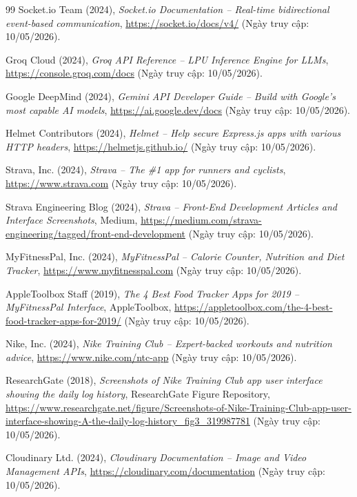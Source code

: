 \begin{thebibliography}{99}
Socket.io Team (2024), \textit{Socket.io Documentation -- Real-time bidirectional event-based communication}, \url{https://socket.io/docs/v4/} (Ngày truy cập: 10/05/2026).

Groq Cloud (2024), \textit{Groq API Reference -- LPU Inference Engine for LLMs}, \url{https://console.groq.com/docs} (Ngày truy cập: 10/05/2026).

Google DeepMind (2024), \textit{Gemini API Developer Guide -- Build with Google's most capable AI models}, \url{https://ai.google.dev/docs} (Ngày truy cập: 10/05/2026).

Helmet Contributors (2024), \textit{Helmet -- Help secure Express.js apps with various HTTP headers}, \url{https://helmetjs.github.io/} (Ngày truy cập: 10/05/2026).

Strava, Inc. (2024), \textit{Strava -- The \#1 app for runners and cyclists}, \url{https://www.strava.com} (Ngày truy cập: 10/05/2026).

Strava Engineering Blog (2024), \textit{Strava -- Front-End Development Articles and Interface Screenshots}, Medium, \url{https://medium.com/strava-engineering/tagged/front-end-development} (Ngày truy cập: 10/05/2026).

MyFitnessPal, Inc. (2024), \textit{MyFitnessPal -- Calorie Counter, Nutrition and Diet Tracker}, \url{https://www.myfitnesspal.com} (Ngày truy cập: 10/05/2026).

AppleToolbox Staff (2019), \textit{The 4 Best Food Tracker Apps for 2019 -- MyFitnessPal Interface}, AppleToolbox, \url{https://appletoolbox.com/the-4-best-food-tracker-apps-for-2019/} (Ngày truy cập: 10/05/2026).

Nike, Inc. (2024), \textit{Nike Training Club -- Expert-backed workouts and nutrition advice}, \url{https://www.nike.com/ntc-app} (Ngày truy cập: 10/05/2026).

ResearchGate (2018), \textit{Screenshots of Nike Training Club app user interface showing the daily log history}, ResearchGate Figure Repository, \url{https://www.researchgate.net/figure/Screenshots-of-Nike-Training-Club-app-user-interface-showing-A-the-daily-log-history_fig3_319987781} (Ngày truy cập: 10/05/2026).

Cloudinary Ltd. (2024), \textit{Cloudinary Documentation -- Image and Video Management APIs}, \url{https://cloudinary.com/documentation} (Ngày truy cập: 10/05/2026).


\end{thebibliography}
